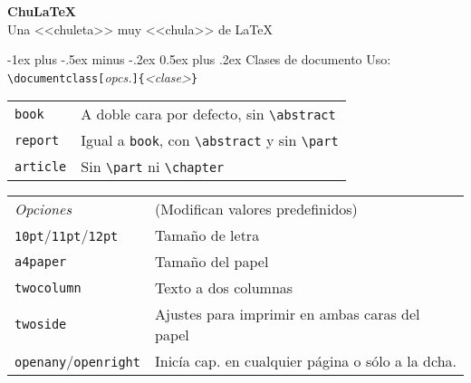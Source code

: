 \documentclass[10pt,landscape,a4paper]{article}
\makeatletter
\renewcommand{\section}{\@startsection{section}{1}{0mm}%
                                {-1ex plus -.5ex minus -.2ex}%
                                {0.5ex plus .2ex}%
                                {\normalfont\large\bfseries}}
\makeatother
\begin{document}
\raggedright
\footnotesize
\begin{multicols}{3}


\setlength{\premulticols}{1pt}
\setlength{\postmulticols}{1pt}
\setlength{\multicolsep}{1pt}
\setlength{\columnsep}{2pt}

\begin{flushleft}
     \Large{\textbf{Chu\LaTeX}} \\
     {Una <<chuleta>> muy <<chula>> de \LaTeX} \\
\end{flushleft}

\section{Clases de documento} 
  Uso: \verb!\documentclass[!\emph{opcs.}\verb!]{!\emph{<clase>}\verb!}!
\begin{tabular}{@{}ll@{}}
\verb!book!    & A doble cara por defecto, sin \verb+\abstract+ \\
\verb!report!  & Igual a \texttt{book}, con \verb+\abstract+ y sin \verb!\part! \\
\verb!article! & Sin \verb!\part! ni \verb!\chapter! \\[0.7mm]
\end{tabular}

\newlength{\MyLen}
\begin{tabular}{@{}ll@{}}
\emph{Opciones} & (Modifican valores predefinidos) \\
\texttt{10pt}/\texttt{11pt}/\texttt{12pt} & Tamaño de letra \\
\texttt{a4paper} & Tamaño del papel \\
\texttt{twocolumn} & Texto a dos columnas \\
\texttt{twoside}   & Ajustes para imprimir en ambas caras del papel \\
\texttt{openany}/\texttt{openright} & Inicía cap. en cualquier página o sólo a la dcha.
\end{tabular}






\end{multicols}
\end{document}
